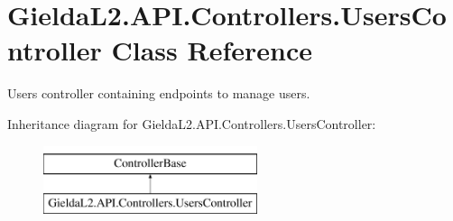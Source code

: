 \hypertarget{class_gielda_l2_1_1_a_p_i_1_1_controllers_1_1_users_controller}{}\section{Gielda\+L2.\+A\+P\+I.\+Controllers.\+Users\+Controller Class Reference}
\label{class_gielda_l2_1_1_a_p_i_1_1_controllers_1_1_users_controller}


Users controller containing endpoints to manage users.  


Inheritance diagram for Gielda\+L2.\+A\+P\+I.\+Controllers.\+Users\+Controller\+:\begin{figure}[H]
\begin{center}
\leavevmode
\includegraphics[height=2.000000cm]{class_gielda_l2_1_1_a_p_i_1_1_controllers_1_1_users_controller}
\end{center}
\end{figure}
